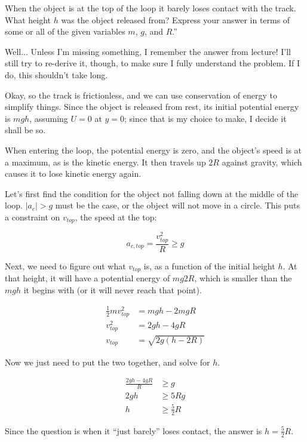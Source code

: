 \documentclass[12pt,a4paper]{report}
\begin{document}
When the object is at the top of the loop it barely loses contact with the track. What height $h$ was the object released from? Express your answer in terms of some or all of the given variables $m$, $g$, and $R$.''

Well... Unless I'm missing something, I remember the answer from lecture! I'll still try to re-derive it, though, to make sure I fully understand the problem. If I do, this shouldn't take long.

Okay, so the track is frictionless, and we can use conservation of energy to simplify things. Since the object is released from rest, its initial potential energy is $m g h$, assuming $U = 0$ at $y = 0$; since that is my choice to make, I decide it shall be so.

When entering the loop, the potential energy is zero, and the object's speed is at a maximum, as is the kinetic energy. It then travels up $2 R$ against gravity, which causes it to lose kinetic energy again.

Let's first find the condition for the object not falling down at the middle of the loop. $|a_c| > g$ must be the case, or the object will not move in a circle. This puts a constraint on $v_{top}$, the speed at the top:

\begin{equation}
a_{c,top} = \frac{v_{top}^2}{R} \ge g
\end{equation}

Next, we need to figure out what $v_{top}$ is, as a function of the initial height $h$. At that height, it will have a potential energy of $m g 2 R$, which is smaller than the $m g h$ it begins with (or it will never reach that point).

\begin{align}
\frac{1}{2} m v_{top}^2 &= m g h - 2 m g R\\
v_{top}^2 &= 2 g h - 4 g R\\
v_{top} &= \sqrt{2g(h - 2 R)}
\end{align}

Now we just need to put the two together, and solve for $h$.

\begin{align}
\frac{2 g h - 4 g R}{R} &\ge g\\
2 g h &\ge 5 R g\\
h &\ge \frac{5}{2} R
\end{align}

Since the question is when it ``just barely'' loses contact, the answer is $\displaystyle h = \frac{5}{2} R$.
\end{document}
